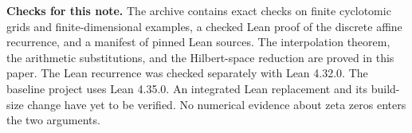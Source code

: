 \documentclass[11pt]{article}
\begin{document}
\textbf{Checks for this note.} The archive contains exact checks on finite cyclotomic grids and finite-dimensional examples, a checked Lean proof of the discrete affine recurrence, and a manifest of pinned Lean sources. The interpolation theorem, the arithmetic substitutions, and the Hilbert-space reduction are proved in this paper. The Lean recurrence was checked separately with Lean 4.32.0. The baseline project uses Lean 4.35.0. An integrated Lean replacement and its build-size change have yet to be verified. No numerical evidence about zeta zeros enters the two arguments.
\end{document}
